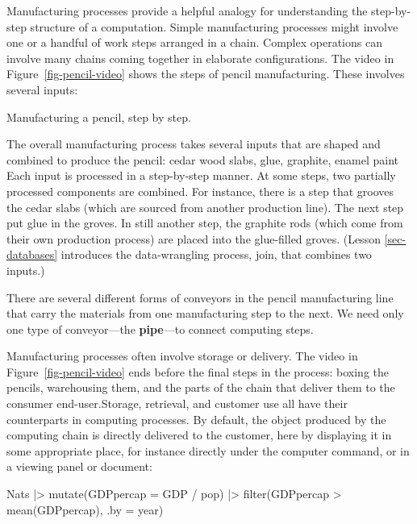 \documentclass[
  letterpaper,
  DIV=11,
  numbers=noendperiod,
  oneside]{scrartcl}
\newenvironment{Shaded}{\begin{snugshade}}{\end{snugshade}}
\newcommand{\AttributeTok}[1]{\textcolor[rgb]{0.40,0.45,0.13}{#1}}
\newcommand{\FunctionTok}[1]{\textcolor[rgb]{0.28,0.35,0.67}{#1}}
\newcommand{\NormalTok}[1]{\textcolor[rgb]{0.00,0.23,0.31}{#1}}
\newcommand{\SpecialCharTok}[1]{\textcolor[rgb]{0.37,0.37,0.37}{#1}}
\begin{document}
Manufacturing processes provide a helpful analogy for understanding the
step-by-step structure of a computation. Simple manufacturing processes
might involve one or a handful of work steps arranged in a chain.
Complex operations can involve many chains coming together in elaborate
configurations. The video in Figure~\ref{fig-pencil-video} shows the
steps of pencil manufacturing. These involves several inputs:

\begin{marginfigure}


\caption{\label{fig-pencil-video}Manufacturing a pencil, step by step.}

\end{marginfigure}%

The overall manufacturing process takes several inputs that are shaped
and combined to produce the pencil: cedar wood slabs, glue, graphite,
enamel paint Each input is processed in a step-by-step manner. At some
steps, two partially processed components are combined. For instance,
there is a step that grooves the cedar slabs (which are sourced from
another production line). The next step put glue in the groves. In still
another step, the graphite rods (which come from their own production
process) are placed into the glue-filled groves. (Lesson
\ref{sec-databases} introduces the data-wrangling process, join, that
combines two inputs.)

There are several different forms of conveyors in the pencil
manufacturing line that carry the materials from one manufacturing step
to the next. We need only one type of conveyor---the \textbf{pipe}---to
connect computing steps.

Manufacturing processes often involve storage or delivery. The video in
Figure~\ref{fig-pencil-video} ends before the final steps in the
process: boxing the pencils, warehousing them, and the parts of the
chain that deliver them to the consumer end-user.Storage, retrieval, and
customer use all have their counterparts in computing processes. By
default, the object produced by the computing chain is directly
delivered to the customer, here by displaying it in some appropriate
place, for instance directly under the computer command, or in a viewing
panel or document:

\begin{Shaded}
\begin{Highlighting}[]
\NormalTok{Nats }\SpecialCharTok{|\textgreater{}}
  \FunctionTok{mutate}\NormalTok{(}\AttributeTok{GDPpercap =}\NormalTok{ GDP }\SpecialCharTok{/}\NormalTok{ pop) }\SpecialCharTok{|\textgreater{}}
  \FunctionTok{filter}\NormalTok{(GDPpercap }\SpecialCharTok{\textgreater{}} \FunctionTok{mean}\NormalTok{(GDPpercap), }\AttributeTok{.by =}\NormalTok{ year)}
\end{Highlighting}
\end{Shaded}
\end{document}
